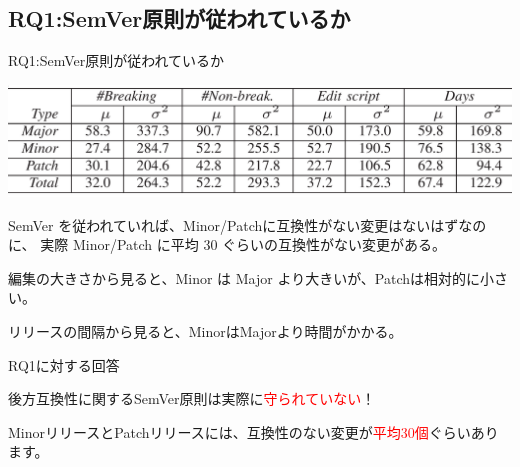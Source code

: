 \subsection{RQ1:SemVer原則が従われているか}
\begin{frame}{RQ1:SemVer原則が従われているか}

\includegraphics[width=\textwidth]{table4}

SemVer を従われていれば、Minor/Patchに互換性がない変更はないはずなのに、
実際 Minor/Patch に平均 30 ぐらいの互換性がない変更がある。

\pause\vspace{0.5em}

編集の大きさから見ると、Minor は Major より大きいが、Patchは相対的に小さい。

\pause\vspace{0.5em}

リリースの間隔から見ると、MinorはMajorより時間がかかる。
\end{frame}

\begin{frame}{RQ1に対する回答}

{\Huge
後方互換性に関するSemVer原則は実際に\textcolor{red}{守られていない}！
}

\pause\vspace{1em}

{\Large
MinorリリースとPatchリリースには、互換性のない変更が\textcolor{red}{平均30個}ぐらいあります。
}

\end{frame}
